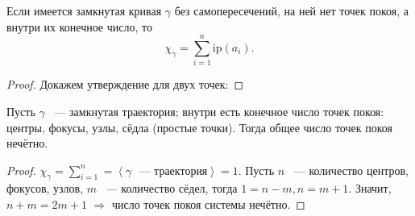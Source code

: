 \begin{proposition}
Если имеется замкнутая кривая $\gamma$ без самопересечений, на ней нет точек покоя, а внутри их конечное число, то
\[ \chi_\gamma = \sum \limits_{i = 1}^n \mathrm{ip}(a_i). \]
\end{proposition}

\begin{proof}
Докажем утверждение для двух точек:
%
\end{proof}

\begin{theorem}
Пусть \( \gamma \) ~--- замкнутая траектория; внутри есть конечное число точек покоя: центры, фокусы, узлы, сёдла (простые точки). Тогда общее число точек покоя нечётно.
\end{theorem}

\begin{proof}
\( \chi_\gamma = \sum \limits_{i = 1}^n = \left\langle \text{$\gamma$ ~--- траектория} \right\rangle = 1. \)
Пусть $n$ ~--- количество центров, фокусов, узлов, $m$ ~--- количество сёдел, тогда \( 1 = n - m, n = m + 1. \) Значит, \( n + m = 2m + 1 \) \( \Rightarrow \) число точек покоя системы нечётно. 
\end{proof}
